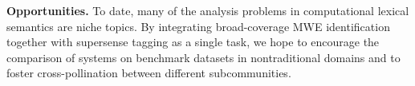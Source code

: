 \documentclass[11pt]{article}
\newcommand{\ensuretext}[1]{#1}
\newcommand{\nssmarker}{\ensuretext{\textcolor{magenta}{\ensuremath{^{\textsc{NS}}_{\textsc{S}}}}}}
\newcommand{\arkcomment}[3]{\ensuretext{\textcolor{#3}{[#1 #2]}}}
\newcommand{\nss}[1]{\arkcomment{\nssmarker}{#1}{magenta}}
\newcommand{\longversion}[1]{#1} %
\begin{document}
% 
% 

\textbf{Opportunities.} 
To date, many of the analysis problems in computational lexical semantics are niche topics. 
By integrating broad-coverage MWE identification together with supersense tagging 
as a single task, we hope to encourage the comparison of systems on benchmark datasets 
in nontraditional domains and to foster cross-pollination between different subcommunities. 

\end{document}
